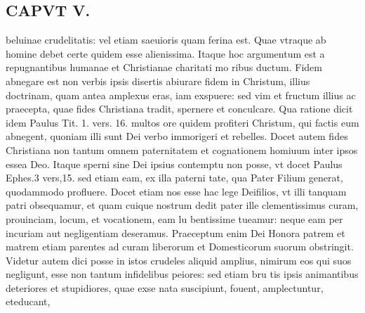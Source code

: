 \documentclass{article}
\begin{document}
\begin{pages}
\section*{CAPVT  V. }
\marginpar{[ p.267 ]}\pstart beluinae crudelitatis: vel etiam saeuioris quam ferina est. Quae vtraque ab homine debet certe quidem esse alienissima. Itaque hoc argumentum est a repugnantibus humanae et Christianae charitati mo ribus ductum. Fidem abnegare est non verbis ipsis disertis abiurare fidem in Christum, illius doctrinam, quam antea amplexus eras, iam exspuere: sed vim et fructum illius ac praecepta, quae fides Christiana tradit, spernere et conculcare. Qua ratione dicit idem Paulus Tit. 1. vers. 16. multos ore quidem profiteri Christum, qui factis eum abnegent, quoniam illi sunt Dei verbo immorigeri et rebelles. Docet autem fides Christiana non tantum omnem paternitatem et cognationem homiuum inter ipsos essea Deo. Itaque sperni sine Dei ipsius contemptu non posse, vt docet Paulus Ephes.3 vers,15. sed etiam eam, ex illa paterni tate, qua Pater Filium generat, quodammodo profluere. Docet etiam nos esse hac lege Deifilios, vt illi tanquam patri obsequamur, et quam cuique nostrum dedit pater ille clementissimus curam, prouinciam, locum, et vocationem, eam lu bentissime tueamur: neque eam per incuriam aut negligentiam deseramus. Praeceptum enim Dei Honora patrem et matrem etiam parentes ad curam liberorum et Domesticorum suorum obstringit. Videtur autem dici posse in istos crudeles aliquid amplius, nimirum eos qui suos negligunt, esse non tantum infidelibus peiores: sed etiam bru tis ipsis animantibus deteriores et stupidiores, quae exse nata suscipiunt, fouent, amplectuntur, eteducant,  \pend

\end{pages}
\end{document}
